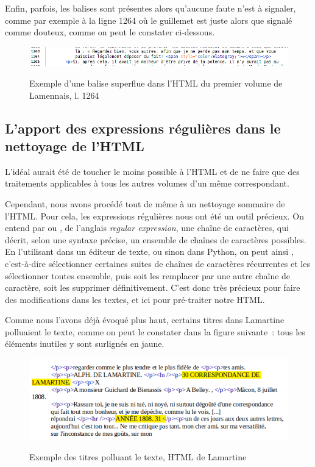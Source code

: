 Enfin, parfois, les balises  sont présentes alors qu’aucune faute n’est à signaler, comme par exemple à la ligne 1264 où le guillemet est juste alors que signalé comme douteux, comme on peut le constater ci-dessous. 

\begin{figure}[ht]
    \centering
    \caption{Exemple d'une balise  superflue dans l'HTML du premier volume de Lamennais, l. 1264}
    \includegraphics[width=16cm]{images/span_inutile_lamennais.png}
    \label{span_inutile_lamennais}
\end{figure}



\subsection{L'apport des expressions régulières dans le nettoyage de l'HTML}

L'idéal aurait été de toucher le moins possible à l'HTML et de ne faire que des traitements applicables à tous les autres volumes d'un même correspondant. 

Cependant, nous avons procédé tout de même à un nettoyage sommaire de l'HTML. Pour cela, les expressions régulières nous ont été un outil précieux. On entend par  ou , de l'anglais \emph{regular expression}, une chaîne de caractères, qui décrit, selon une syntaxe précise, un ensemble de chaînes de caractères possibles. En l'utilisant dans un éditeur de texte, ou sinon dans Python, on peut ainsi , c'est-à-dire sélectionner certaines suites de chaînes de caractères récurrentes et les sélectionner toutes ensemble, puis soit les remplacer par une autre chaîne de caractère, soit les supprimer définitivement. C'est donc très précieux pour faire des modifications dans les textes, et ici pour pré-traiter notre HTML.

Comme nous l'avons déjà évoqué plus haut, certains titres dans Lamartine polluaient le texte, comme on peut le constater dans la figure suivante~: tous les éléments inutiles y sont surlignés en jaune.

\begin{figure}[ht]
    \centering
    \caption{Exemple des titres polluant le texte, HTML de Lamartine}
    \includegraphics[width=16cm]{images/titres_lamartine.png}
    \label{titres_lamartine}
\end{figure}


